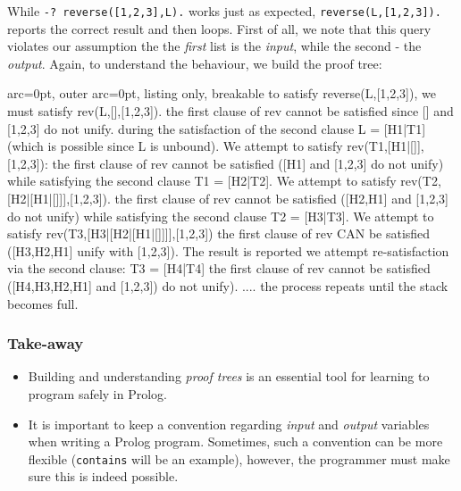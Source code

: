 While \texttt{-? reverse([1,2,3],L).} works just as expected, \texttt{reverse(L,[1,2,3]).} reports the correct result and then loops. First of all, we note that this query violates our assumption the the \textit{first} list is the \textit{input}, while the second - the \textit{output}. Again, to understand the behaviour, we build the proof tree:


\begin{tcblisting}{ arc=0pt, outer arc=0pt, listing only, breakable}
to satisfy reverse(L,[1,2,3]), we must satisfy rev(L,[],[1,2,3]).
the first clause of rev cannot be satisfied since [] and [1,2,3] do not unify.
during the satisfaction of the second clause L = [H1|T1] (which is possible since L is unbound). 
  We attempt to satisfy rev(T1,[H1|[]],[1,2,3]):
    the first clause of rev cannot be satisfied ([H1] and [1,2,3] do not unify)
    while satisfying the second clause T1 = [H2|T2].
      We attempt to satisfy rev(T2,[H2|[H1|[]]],[1,2,3]).
         the first clause of rev cannot be satisfied ([H2,H1] and [1,2,3] do not unify)
         while satisfying the second clause T2 = [H3|T3].
            We attempt to satisfy rev(T3,[H3|[H2|[H1|[]]]],[1,2,3])
              the first clause of rev CAN be satisfied ([H3,H2,H1] unify with [1,2,3]). The result is reported
              we attempt re-satisfaction via the second clause: T3 = [H4|T4]
                the first clause of rev cannot be satisfied ([H4,H3,H2,H1] and [1,2,3]) do not unify).
                ....
                the process repeats until the stack becomes full.

\end{tcblisting}


\subsubsection*{ Take-away }

\begin{itemize}
	\item  Building and understanding \textit{proof trees} is an essential tool for learning to program safely in Prolog.
	\item  It is important to keep a convention regarding \textit{input} and \textit{output} variables when writing a Prolog program. Sometimes, such a convention can be more flexible (\texttt{contains} will be an example), however, the programmer must make sure this is indeed possible.
\end{itemize}
